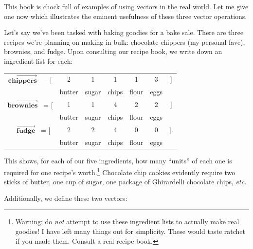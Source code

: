 This book is chock full of examples of using vectors in the real world. Let me
give one now which illustrates the eminent usefulness of these three vector
operations.

\smallskip
\label{bakeSale}
Let's say we've been tasked with baking goodies for a bake sale. There are
three recipes we're planning on making in bulk: chocolate chippers (my personal
fave), brownies, and fudge. Upon consulting our recipe book, we write down an
ingredient list for each:


\begin{center}
\begin{tabular}{ccccccc}
$\overrightarrow{\textbf{chippers}}$ \ = [ & 2 & 1 & 1 & 1 & 3 &] \\
& \scriptsize{butter} & \scriptsize{sugar} & \scriptsize{chips} &
\scriptsize{flour} & \scriptsize{eggs} \smallskip \\
$\overrightarrow{\textbf{brownies}}$ \ = [ & 1 & 1 & 4 & 2 & 2 &] \\
& \scriptsize{butter} & \scriptsize{sugar} & \scriptsize{chips} &
\scriptsize{flour} & \scriptsize{eggs} \smallskip \\
\ \ $\overrightarrow{\textbf{fudge}}$ \quad \ = [ & 2 & 2 & 4 & 0 & 0 &]. \\
& \scriptsize{butter} & \scriptsize{sugar} & \scriptsize{chips} &
\scriptsize{flour} & \scriptsize{eggs} \bigskip \\
\end{tabular}
\end{center}
\vspace{-.05in}

This shows, for each of our five ingredients, how many ``units'' of each one is
required for one recipe's worth.\footnote{Warning: do \textit{not} attempt to
use these ingredient lists to actually make real goodies! I have left many
things out for simplicity. These would taste ratchet if you made them. Consult
a real recipe book.} Chocolate chip cookies evidently require two sticks of
butter, one cup of sugar, one package of Ghirardelli chocolate chips,
\textit{etc.}

\medskip

Additionally, we define these two vectors:

